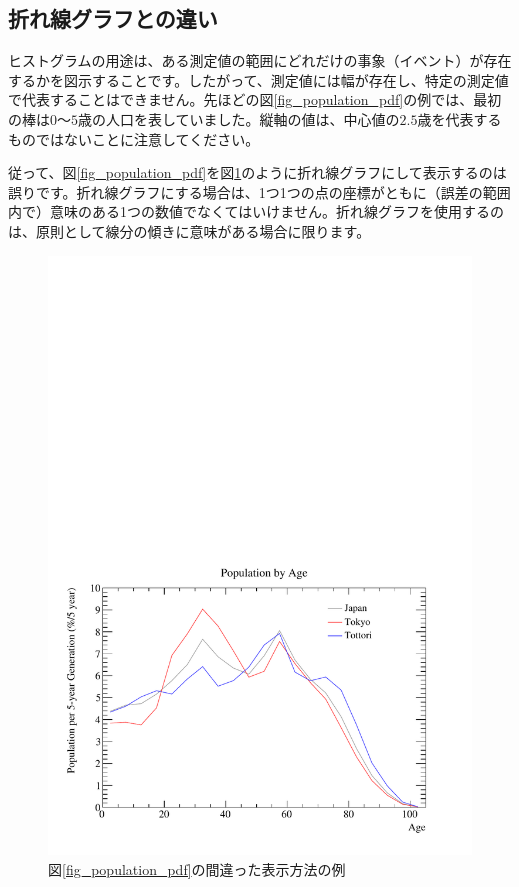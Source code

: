 \subsection{折れ線グラフとの違い}

ヒストグラムの用途は、ある測定値の範囲にどれだけの事象（イベント）が存在するかを図示することです。したがって、測定値には幅が存在し、特定の測定値で代表することはできません。先ほどの図\ref{fig_population_pdf}の例では、最初の棒は$0$〜$5$歳の人口を表していました。縦軸の値は、中心値の$2.5$歳を代表するものではないことに注意してください。

従って、図\ref{fig_population_pdf}を図\ref{fig_population2_pdf}のように折れ線グラフにして表示するのは誤りです。折れ線グラフにする場合は、1つ1つの点の座標がともに（誤差の範囲内で）意味のある1つの数値でなくてはいけません。折れ線グラフを使用するのは、原則として線分の傾きに意味がある場合に限ります。

\begin{figure}
  \centering
  \includegraphics[width=12cm,clip]{fig/population2.pdf}
  \caption{図\ref{fig_population_pdf}の間違った表示方法の例}
  \label{fig_population2_pdf}
\end{figure}


